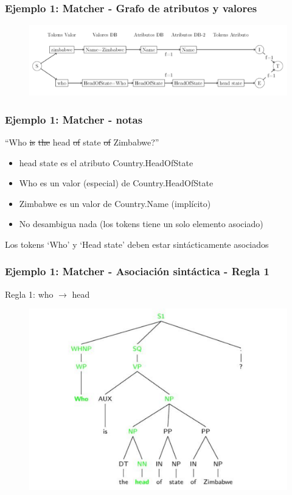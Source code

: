 \begin{frame}
\frametitle{Ejemplo 1: Matcher - Grafo de atributos y valores}
\begin{figure}
  \centering
    \includegraphics[scale=.33]{graficos/presentacion/ejemplo-grafo-matcher-1-6}
\end{figure}
\end{frame}
\begin{frame}[t]
\frametitle{Ejemplo 1: Matcher - notas}
\Large{``{\color{blue}Who} \st{is} \st{the} {\color{blue}head} \st{of} {\color{blue}state} \st{of} {\color{purple}Zimbabwe}?''}
\normalsize{
\begin{itemize}
  \item {\color{blue}head state} es el atributo {\color{blue}Country.HeadOfState}
  \item {\color{blue}Who} es un valor (especial) de {\color{blue}Country.HeadOfState}
  \item {\color{purple}Zimbabwe} es un valor de Country.Name ({\color{purple}implícito})
  \item No desambigua nada (los tokens tiene un solo elemento asociado)
\end{itemize}
}
\bigskip
Los tokens `Who' y `Head state' deben estar sintácticamente asociados

\end{frame}
\begin{frame}[t]
\frametitle{Ejemplo 1: Matcher - Asociación sintáctica - Regla 1}
\Large{Regla 1: who $\rightarrow$ head}
\begin{center}
\begin{figure}
  \centering
    \includegraphics[scale=.5]{graficos/presentacion/ejemplo-charniak-2}
\end{figure}

\end{center}
\end{frame}

